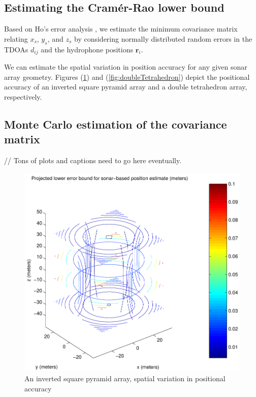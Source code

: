 \documentclass[10pt]{article}
\begin{document}
\subsection{Estimating the Cram\'{e}r-Rao lower bound}

Based on Ho's error analysis \cite{Ho} \cite{Ho:2007lr}, we estimate the minimum covariance matrix relating \(x_s\), \(y_s\), and \(z_s\) by considering normally distributed random errors in the TDOAs \(d_{ij}\) and the hydrophone positions \(\mathbf{r}_i\).

We can estimate the spatial variation in position accuracy for any given sonar array geometry.  Figures (\ref{fig:squarePyramid}) and (\ref{fig:doubleTetrahedron}) depict the positional accuracy of an inverted square pyramid array and a double tetrahedron array, respectively.

\subsection{Monte Carlo estimation of the covariance matrix}

// Tons of plots and captions need to go here eventually.

\begin{figure}[htbp]
\begin{center}
\includegraphics[scale=0.5]{squarePyramid.pdf}
\caption{An inverted square pyramid array, spatial variation in positional accuracy}
\label{fig:squarePyramid}
\end{center}
\end{figure}
\end{document}
